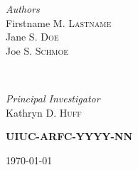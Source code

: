 \begin{titlepage}
    \vspace{0.2cm}
    \HRule
    \vspace{0.5cm}
    
    
    \begin{minipage}{0.4\textwidth}
        \begin{flushleft}
            \large
            \textit{Authors}\\
            Firstname M. \textsc{Lastname}\\
            Jane S. \textsc{Doe}\\
            Joe S. \textsc{Schmoe}
        \end{flushleft}
    \end{minipage}
    ~
    \begin{minipage}{0.4\textwidth}
        \begin{flushright}
            \large
            \textit{Principal Investigator}\\
            Kathryn D. \textsc{Huff} %
        \end{flushright}
    \end{minipage}
    

    \vspace{1cm}
    \textsc{\LARGE\bfseries UIUC-ARFC-YYYY-NN} %
    \vspace{0.5cm}
    
    
    \vspace{0.5cm} %
    {\large\today} %
    \vspace{0.5cm}

    

\end{titlepage}

